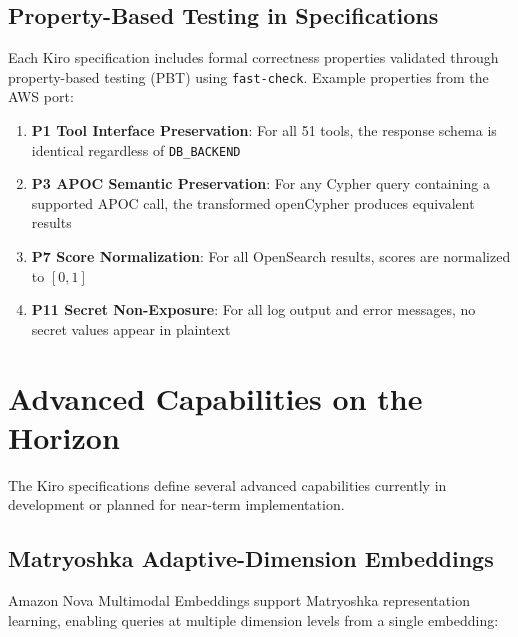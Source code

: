 \documentclass[11pt,letterpaper]{article}
\begin{document}
\subsection{Property-Based Testing in Specifications}

Each Kiro specification includes formal correctness properties validated
through property-based testing (PBT) using \texttt{fast-check}. Example
properties from the AWS port:

\begin{enumerate}[noitemsep]
    \item \textbf{P1 Tool Interface Preservation}: For all 51 tools, the
          response schema is identical regardless of \texttt{DB\_BACKEND}
    \item \textbf{P3 APOC Semantic Preservation}: For any Cypher query
          containing a supported APOC call, the transformed openCypher
          produces equivalent results
    \item \textbf{P7 Score Normalization}: For all OpenSearch results,
          scores are normalized to $[0, 1]$
    \item \textbf{P11 Secret Non-Exposure}: For all log output and error
          messages, no secret values appear in plaintext
\end{enumerate}

\section{Advanced Capabilities on the Horizon}
\label{sec:advanced}

The Kiro specifications define several advanced capabilities currently in
development or planned for near-term implementation.

\subsection{Matryoshka Adaptive-Dimension Embeddings}

Amazon Nova Multimodal Embeddings support Matryoshka representation
learning, enabling queries at multiple dimension levels from a single
embedding:
\end{document}
